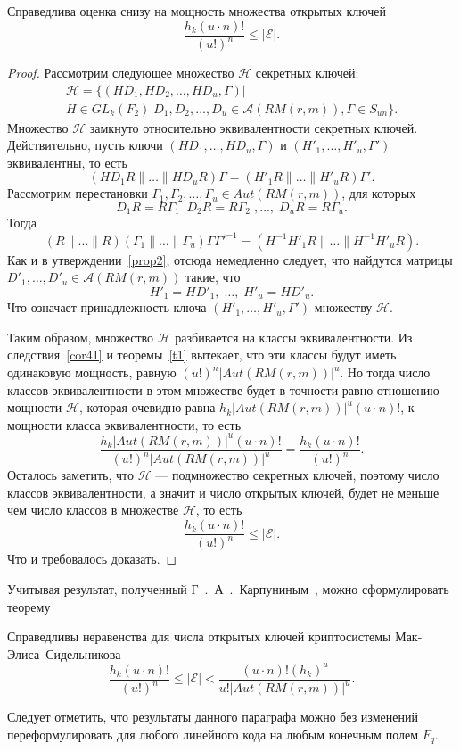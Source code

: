 \begin{proposition}
Справедлива оценка снизу  на мощность множества открытых ключей
$$
\frac{h_k(u\cdot n)!}{(u!)^n}\leqslant |\mathcal E|.
$$
\end{proposition}
\begin{proof}
Рассмотрим следующее множество \(\mathcal H\) секретных ключей:
\begin{multline*}
    \mathcal H=\{(HD_1,HD_2,\ldots,HD_u,\Gamma)|\\ H\in
GL_k(F_2)\;D_1,D_2,\ldots,D_u\in\mathcal A(RM(r,m)), \Gamma\in
S_{un}\}.
\end{multline*}
Множество $\mathcal H$ замкнуто относительно эквивалентности
секретных ключей. Действительно, пусть ключи
$(HD_1,\ldots,HD_u,\Gamma)$ и $(H'_1,\ldots,H'_u,\Gamma')$
эквивалентны, то есть
$$
(HD_1R\|\ldots\|HD_uR)\Gamma=(H'_1R\|\ldots\|H'_uR)\Gamma'.
$$
Рассмотрим перестановки $\Gamma_1,\Gamma_2,\ldots,\Gamma_u\in
Aut(RM(r,m))$, для которых
$$
D_1R=R\Gamma_1\;\;D_2R=R\Gamma_2\;,\ldots,\;D_uR=R\Gamma_u.
$$
Тогда
$$
(R\|\ldots\|R)(\Gamma_1\|\ldots\|\Gamma_u)\Gamma\Gamma'^{-1}=(H^{-1}H'_1R\|\ldots\|H^{-1}H'_uR).
$$
Как и в утверждении~\ref{prop2}, отсюда немедленно следует, что
найдутся матрицы $D'_1,\ldots,D'_u\in \mathcal A(RM(r,m))$ такие,
что
$$
H'_1=HD'_1,\;\ldots,\;H'_u=HD'_u.
$$
Что означает принадлежность ключа $(H'_1,\ldots,H'_u,\Gamma')$
множеству $\mathcal H$.

Таким образом, множество $\mathcal H$ разбивается на классы
эквивалентности. Из следствия~\ref{cor41} и теоремы~\ref{t1}
вытекает, что эти классы будут иметь одинаковую мощность, равную
$(u!)^n|Aut(RM(r,m))|^u$. Но тогда число классов эквивалентности в
этом множестве будет в точности равно отношению мощности $\mathcal
H$, которая очевидно равна $h_k|Aut(RM(r,m))|^u(u\cdot n)!$, к
мощности класса эквивалентности, то есть
$$
\frac{h_k|Aut(RM(r,m))|^u(u\cdot
n)!}{(u!)^n|Aut(RM(r,m))|^u}=\frac{h_k(u\cdot n)!}{(u!)^n}.
$$
Осталось заметить, что $\mathcal H$ --- подмножество секретных
ключей, поэтому число классов эквивалентности, а значит и число
открытых ключей, будет не меньше чем число классов в множестве
$\mathcal H$, то есть
$$
\frac{h_k(u\cdot n)!}{(u!)^n}\leqslant |\mathcal E|.
$$
Что и требовалось доказать.
\end{proof}
Учитывая результат, полученный Г~.~А~.~Карпуниным~\cite{Karpunin},
можно сформулировать теорему
\begin{theorem}\label{t3}
Справедливы неравенства для числа открытых ключей криптосистемы
Мак-Элиса--Сидельникова
$$
\frac{h_k(u\cdot n)!}{(u!)^n}\leqslant |\mathcal E|<\frac{(u\cdot
n)!(h_k)^u}{u!|Aut(RM(r,m))|^u}.
$$
\end{theorem}


Следует отметить, что результаты данного параграфа можно без
изменений переформулировать для любого линейного кода на любым
конечным полем $F_q$.